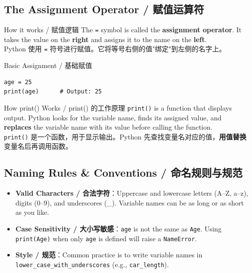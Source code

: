 \documentclass[11pt,a4paper]{report}
\let\oldtexttt\texttt
\renewcommand{\texttt}[1]{\textcolor{mainblue}{\oldtexttt{#1}}}
\begin{document}
\subsection{The Assignment Operator / 赋值运算符}
\begin{concept}{How it works / 赋值逻辑}
    The \texttt{=} symbol is called the \textbf{assignment operator}. It takes the value on the \textbf{right} and assigns it to the name on the \textbf{left}. \\
    Python 使用 \texttt{=} 符号进行赋值。它将等号右侧的值"绑定"到左侧的名字上。
\end{concept}

\begin{examplebox}{Basic Assignment / 基础赋值}
\begin{lstlisting}
age = 25
print(age)      # Output: 25
\end{lstlisting}
\end{examplebox}

\begin{concept}{How print() Works / print() 的工作原理}
    \texttt{print()} is a function that displays output. Python looks for the variable name, finds its assigned value, and \textbf{replaces} the variable name with its value before calling the function. \\
    \texttt{print()} 是一个函数，用于显示输出。Python 先查找变量名对应的值，\textbf{用值替换}变量名后再调用函数。
\end{concept}

\subsection{Naming Rules \& Conventions / 命名规则与规范}

\begin{itemize}[itemsep=0.3em]
    \item \textbf{Valid Characters / 合法字符}：Uppercase and lowercase letters (A–Z, a–z), digits (0–9), and underscores (\_). Variable names can be as long or as short as you like.
    \item \textbf{Case Sensitivity / 大小写敏感}：\texttt{age} is not the same as \texttt{Age}. Using \texttt{print(Age)} when only \texttt{age} is defined will raise a \texttt{NameError}.
    \item \textbf{Style / 规范}：Common practice is to write variable names in \texttt{lower\_case\_with\_underscores} (e.g., \texttt{car\_length}).
\end{itemize}
\end{document}

